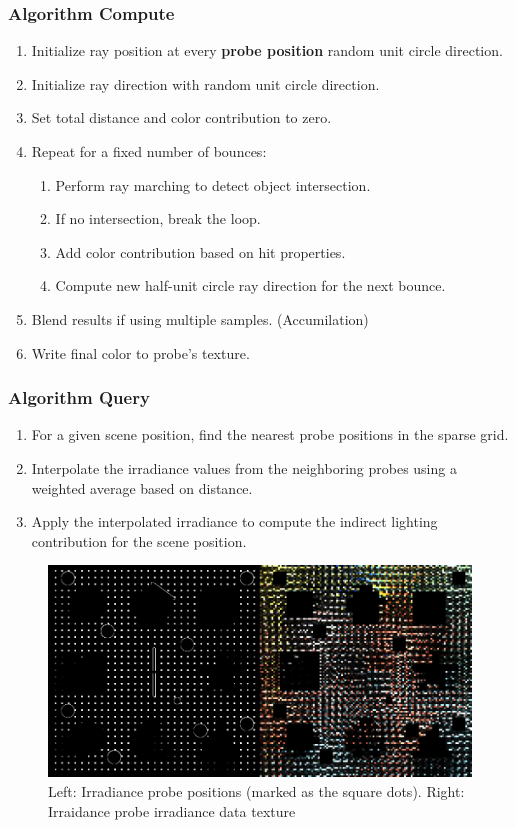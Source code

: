 \documentclass[acmtog, nonacm]{acmart}
\begin{document}
\subsubsection{Algorithm Compute}
\begin{enumerate}
  \item Initialize ray position at every \textbf{probe position} random unit circle direction.
  \item Initialize ray direction with random unit circle direction.
  \item Set total distance and color contribution to zero.
  \item Repeat for a fixed number of bounces:
  \begin{enumerate}
    \item Perform ray marching to detect object intersection.
    \item If no intersection, break the loop.
    \item Add color contribution based on hit properties.
    \item Compute new half-unit circle ray direction for the next bounce.
  \end{enumerate}
  \item Blend results if using multiple samples. (Accumilation)
  \item Write final color to probe's texture.
\end{enumerate}

\subsubsection{Algorithm Query}
\begin{enumerate}
  \item For a given scene position, find the nearest probe positions in the sparse grid.
  \item Interpolate the irradiance values from the neighboring probes using a weighted average based on distance.
  \item Apply the interpolated irradiance to compute the indirect lighting contribution for the scene position.
\end{enumerate}

\begin{figure}[ht]
  \centering
  \includegraphics[width=0.7\linewidth]{irradiance.png}
  \caption{Left: Irradiance probe positions (marked as the square dots). Right: Irraidance probe irradiance data texture}
\end{figure}
\end{document}

